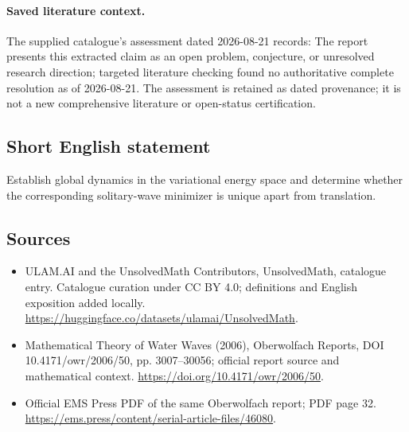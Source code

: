 \documentclass[11pt]{article}
\begin{document}
\paragraph{Saved literature context.} The supplied catalogue's assessment dated 2026-08-21 records: The report presents this extracted claim as an open problem, conjecture, or unresolved research direction; targeted literature checking found no authoritative complete resolution as of 2026-08-21. The assessment is retained as dated provenance; it is not a new comprehensive literature or open-status certification.
\subsection{Short English statement}
Establish global dynamics in the variational energy space and determine whether the corresponding solitary-wave minimizer is unique apart from translation.
\subsection{Sources}
\begin{itemize}
\item[\hypertarget{source:statement:1}{S1}] ULAM.AI and the UnsolvedMath Contributors, UnsolvedMath, catalogue entry. Catalogue curation under CC BY 4.0; definitions and English exposition added locally.
\url{https://huggingface.co/datasets/ulamai/UnsolvedMath}.
\item[\hypertarget{source:statement:2}{S2}] Mathematical Theory of Water Waves (2006), Oberwolfach Reports, DOI 10.4171/owr/2006/50, pp. 3007--30056; official report source and mathematical context.
\url{https://doi.org/10.4171/owr/2006/50}.
\item[\hypertarget{source:statement:3}{S3}] Official EMS Press PDF of the same Oberwolfach report; PDF page 32.
\url{https://ems.press/content/serial-article-files/46080}.
\end{itemize}
\label{end:statement}
\end{document}
